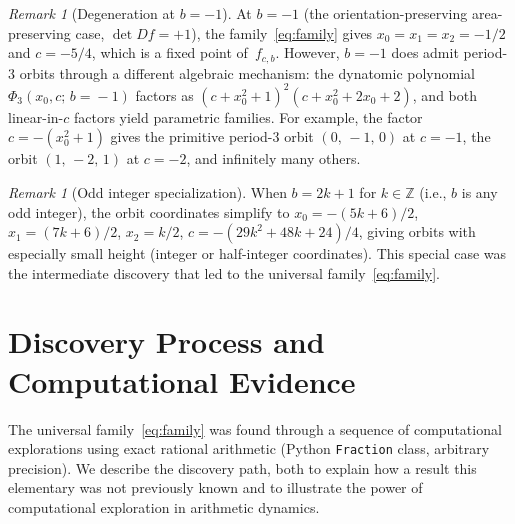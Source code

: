 \documentclass[11pt]{article}
\theoremstyle{definition}
\theoremstyle{remark}
\newtheorem{remark}[theorem]{Remark}
\begin{document}
\begin{remark}[Degeneration at $b = -1$]\label{rem:degenerate}
  At $b = -1$ (the orientation-preserving area-preserving case,
  $\det Df = +1$),
  the family~\eqref{eq:family} gives $x_0 = x_1 = x_2 = -1/2$ and $c = -5/4$,
  which is a fixed point of~$f_{c,b}$.
  However, $b = -1$ does admit period-$3$ orbits through a different algebraic
  mechanism: the dynatomic polynomial $\Phi_3(x_0,c;\, b\!=\!-1)$ factors as
  $(c + x_0^2 + 1)^2(c + x_0^2 + 2x_0 + 2)$,
  and both linear-in-$c$ factors yield parametric families.
  For example, the factor $c = -(x_0^2 + 1)$ gives the primitive
  period-$3$ orbit $(0,\, -1,\, 0)$ at $c = -1$,
  the orbit $(1,\, -2,\, 1)$ at $c = -2$, and infinitely many others.
\end{remark}

\begin{remark}[Odd integer specialization]\label{rem:odd}
  When $b = 2k+1$ for $k \in \mathbb{Z}$ (i.e., $b$ is any odd integer),
  the orbit coordinates simplify to
  $x_0 = -(5k+6)/2$, $x_1 = (7k+6)/2$, $x_2 = k/2$,
  $c = -(29k^2+48k+24)/4$,
  giving orbits with especially small height (integer or half-integer coordinates).
  This special case was the intermediate discovery that led to the
  universal family~\eqref{eq:family}.
\end{remark}


\section{Discovery Process and Computational Evidence}
\label{sec:evidence}

The universal family~\eqref{eq:family} was found through a sequence of
computational explorations using exact rational arithmetic
(Python \texttt{Fraction} class, arbitrary precision).
We describe the discovery path, both to explain how a result this elementary
was not previously known and to illustrate the power of computational
exploration in arithmetic dynamics.
\end{document}
